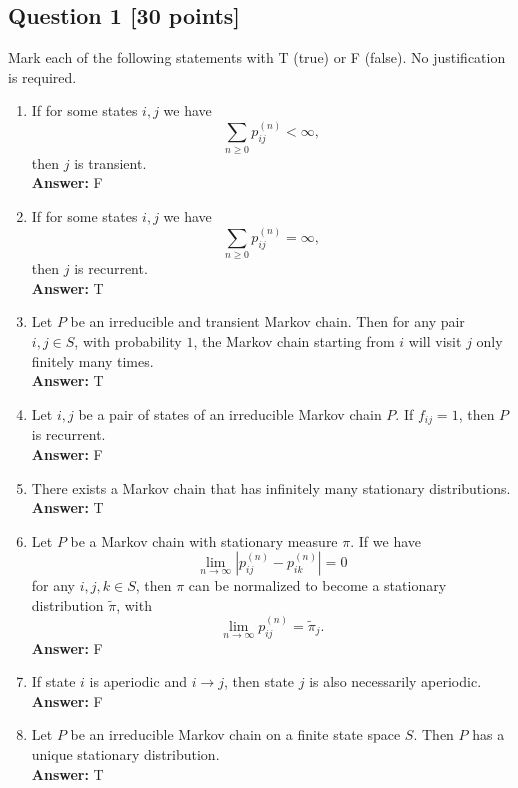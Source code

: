 \documentclass[11pt]{article}
\theoremstyle{definition}
\begin{document}
\subsection*{Question 1 \hfill [30 points]}
Mark each of the following statements with T (true) or F (false). No justification is required.

\begin{enumerate}[label=(\arabic*)]
    \item If for some states \(i,j\) we have
    \[
    \sum_{n\ge 0} p_{ij}^{(n)}<\infty,
    \]
    then \(j\) is transient. \\
    \textbf{Answer:} F

    \item If for some states \(i,j\) we have
    \[
    \sum_{n\ge 0} p_{ij}^{(n)}=\infty,
    \]
    then \(j\) is recurrent. \\
    \textbf{Answer:} T

    \item Let \(P\) be an irreducible and transient Markov chain. Then for any pair \(i,j\in S\), with probability \(1\), the Markov chain starting from \(i\) will visit \(j\) only finitely many times. \\
    \textbf{Answer:} T

    \item Let \(i,j\) be a pair of states of an irreducible Markov chain \(P\). If \(f_{ij}=1\), then \(P\) is recurrent. \\
    \textbf{Answer:} F

    \item There exists a Markov chain that has infinitely many stationary distributions. \\
    \textbf{Answer:} T

    \item Let \(P\) be a Markov chain with stationary measure \(\pi\). If we have
    \[
    \lim_{n\to\infty}|p_{ij}^{(n)}-p_{ik}^{(n)}|=0
    \]
    for any \(i,j,k\in S\), then \(\pi\) can be normalized to become a stationary distribution \(\tilde \pi\), with
    \[
    \lim_{n\to\infty}p_{ij}^{(n)}=\tilde \pi_j.
    \]
    \textbf{Answer:} F

    \item If state \(i\) is aperiodic and \(i\to j\), then state \(j\) is also necessarily aperiodic. \\
    \textbf{Answer:} F

    \item Let \(P\) be an irreducible Markov chain on a finite state space \(S\). Then \(P\) has a unique stationary distribution. \\
    \textbf{Answer:} T


\end{enumerate}
\end{document}
